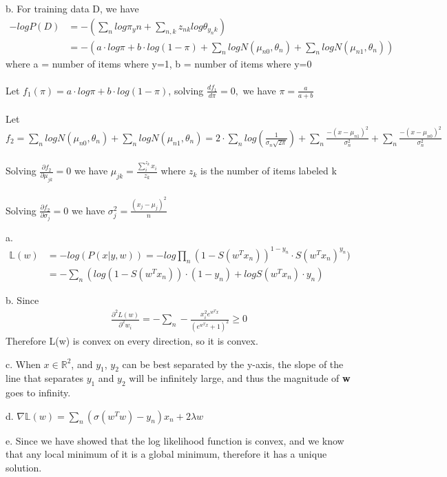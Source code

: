 \documentclass[12pt]{article}
\newenvironment{problem}[2][Problem]{\begin{trivlist}
\item[\hskip \labelsep {\bfseries #1}\hskip \labelsep {\bfseries #2}]}{\end{trivlist}}
\begin{document}
\begin{problem}{1. Naive Bayers}
\item{b.}
For training data D, we have
\begin{align*}
  -logP(D)&= -(\sum_nlog\pi_yn + \sum_{n,k}z_{nk}log\theta_{y_nk}) \\
  &= -(a\cdot log\pi + b\cdot log(1-\pi) + \sum_{n}logN(\mu_{n0}, \theta_n) + \sum_{n}logN(\mu_{n1}, \theta_n))
\end{align*}
where a = number of items where y=1, b = number of items where y=0\\\\
Let $f_1(\pi) = a\cdot log\pi + b\cdot log(1-\pi)$, solving $\frac{df_1}{d\pi} = 0, $ we have $\pi = \frac{a}{a+b}$\\\\
Let $f_2 = \sum_{n}logN(\mu_{n0}, \theta_n) + \sum_{n}logN(\mu_{n1}, \theta_n)
= 2\cdot \sum_n log(\frac{1}{\sigma_n\sqrt{2\pi}}) + \sum_n\frac{-(x-\mu_{n1})^2}{\sigma_n^2} + \sum_n\frac{-(x-\mu_{n0})^2}{\sigma_n^2}$\\\\
Solving $\frac{\partial f_2}{\partial \mu_{jk}} = 0$ we have $\mu_{jk} = \frac{\sum_{i}^{z_k} x_i}{z_k}$ where $z_k$ is the number of items labeled k\\\\
Solving $\frac{\partial f_2}{\partial \sigma_j} = 0$ we have $\sigma_j^2 = \frac{(x_j-\mu_j)^2}{n}$
\end{problem}


\begin{problem}{2. Logistic Regression}
\item{a.} 
\begin{align*}
  \mathbb{L}(w) &= -log(P(x|y, w)) = -log\prod_n(1-S(w^Tx_n))^{1-y_n} \cdot S(w^Tx_n)^{y_n})\\
&= -\sum_n (log(1-S(w^Tx_n))\cdot(1-y_n) + logS(w^Tx_n)\cdot y_n)
\end{align*}
\item{b.}
Since
\begin{align*}
  \frac{\partial^2 L(w)}{\partial^2 w_i} = -\sum_n -\frac{x_i^2e^{w^Tx}}{(e^{w^Tx}+1)^2} \geq 0
\end{align*}
Therefore L(w) is convex on every direction, so it is convex.
\item{c.}
  When $x\in \mathbb{R}^2$, and  $y_1$, $y_2$ can be best separated by the y-axis, the slope of the line that separates $y_1$ and $y_2$ will be infinitely large, and thus the magnitude of \textbf{w} goes to infinity.
\item{d.}
  $\nabla\mathbb{L}(w) = \sum_n(\sigma(w^Tw)-y_n)x_n + 2\lambda w$
\item{e.}
  Since we have showed that the log likelihood function is convex, and we know that any local minimum of it is a global minimum, therefore it has a unique solution.
\end{problem}
\end{document}
